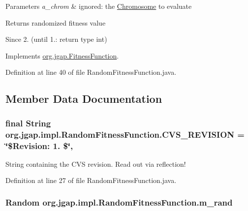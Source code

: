 \begin{DoxyParams}{Parameters}
{\em a\-\_\-chrom} & ignored\-: the \hyperlink{classorg_1_1jgap_1_1_chromosome}{Chromosome} to evaluate \\
\hline
\end{DoxyParams}
\begin{DoxyReturn}{Returns}
randomized fitness value 
\end{DoxyReturn}
\begin{DoxySince}{Since}
2. (until 1.\-: return type int) 
\end{DoxySince}


Implements \hyperlink{classorg_1_1jgap_1_1_fitness_function_a0078e42480eac93729f906ac4dc185d9}{org.\-jgap.\-Fitness\-Function}.



Definition at line 40 of file Random\-Fitness\-Function.\-java.



\subsection{Member Data Documentation}
\hypertarget{classorg_1_1jgap_1_1impl_1_1_random_fitness_function_a5796f3db10a2e69a728830dec72b1f9a}{
\subsubsection[{C\-V\-S\-\_\-\-R\-E\-V\-I\-S\-I\-O\-N}]{\setlength{\rightskip}{0pt plus 5cm}final String org.\-jgap.\-impl.\-Random\-Fitness\-Function.\-C\-V\-S\-\_\-\-R\-E\-V\-I\-S\-I\-O\-N = \char`\"{}\$Revision\-: 1. \$\char`\"{}\hspace{0.3cm}{\ttfamily [static]}, {\ttfamily [private]}}}\label{classorg_1_1jgap_1_1impl_1_1_random_fitness_function_a5796f3db10a2e69a728830dec72b1f9a}
String containing the C\-V\-S revision. Read out via reflection! 

Definition at line 27 of file Random\-Fitness\-Function.\-java.

\hypertarget{classorg_1_1jgap_1_1impl_1_1_random_fitness_function_a232532b1d636f067eeb0b53418c8a5a7}{
\subsubsection[{m\-\_\-rand}]{\setlength{\rightskip}{0pt plus 5cm}Random org.\-jgap.\-impl.\-Random\-Fitness\-Function.\-m\-\_\-rand\hspace{0.3cm}{\ttfamily [private]}}}\label{classorg_1_1jgap_1_1impl_1_1_random_fitness_function_a232532b1d636f067eeb0b53418c8a5a7}


